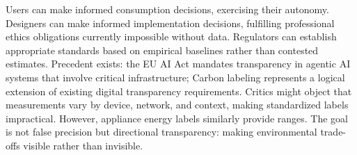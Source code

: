 Users can make informed consumption decisions, exercising their autonomy. Designers can make informed implementation decisions, fulfilling professional ethics obligations currently impossible without data. Regulators can establish appropriate standards based on empirical baselines rather than contested estimates. Precedent exists: the EU AI Act \cite{EUAIAct2024} mandates transparency in agentic AI systems that involve critical infrastructure; Carbon labeling represents a logical extension of existing digital transparency requirements. Critics might object that measurements vary by device, network, and context, making standardized labels impractical. However, appliance energy labels similarly provide ranges. The goal is not false precision but directional transparency: making environmental trade-offs visible rather than invisible.
